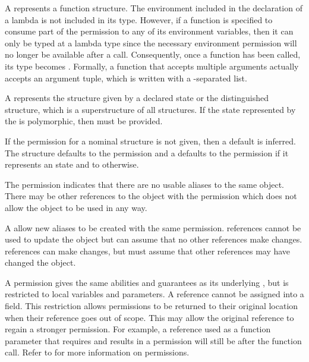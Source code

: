 A  represents a function structure.  
The environment included in the declaration of a lambda is
not included in its type.  However, if a function is specified to 
consume part of the permission to any of its environment variables, 
then it can only be typed at a 
lambda type since the necessary environment permission will no
longer be available after a call.  Consequently, once a 
 function has been called, its type becomes .
Formally, a function that accepts multiple arguments actually accepts an
argument tuple, which is written with a \code{*}-separated list.

A  represents the structure 
given by a declared state
or the distinguished  structure, which is a superstructure
of all structures.  If the state represented by the 
is polymorphic, then  must be provided.

If the permission for a nominal structure is not given, 
then a default is inferred.  The  structure 
defaults to the  permission and a  defaults 
to the  permission if it represents an 
 state and to  otherwise. 

The  permission indicates that there are no
usable aliases to the same object.  There may be other
references to the object with the  permission
which does not allow the object to be used in any way.

A  allow new aliases to be 
created with the same permission.
 references cannot be used to update the object
but can assume that no other references make changes. 
 references can make changes, but must assume that other
references may have changed the object.

A  permission gives the same abilities
and guarantees as its underlying , 
but is restricted to local variables and parameters.  
A  reference cannot be assigned into a field.
This restriction allows  permissions to be
returned to their original location when their reference goes out of 
scope.  This may allow the original reference to regain a stronger permission.
For example, a  reference used as a function parameter
that requires and results in a  permission will
still be  after the function call.  Refer to \cite{naden12:borrowingPermissions}
for more information on  permissions.

